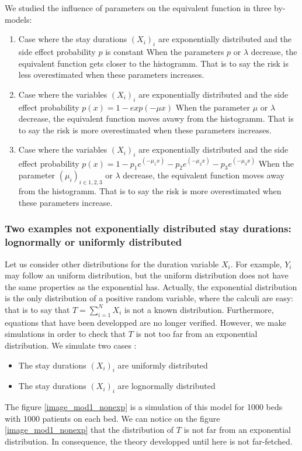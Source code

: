 \documentclass[12pt,twoside]{article}
\begin{document}
We studied the influence of parameters on the equivalent function in three by-models:
\begin{enumerate}
\item{Case where the stay durations $(X_i)_i$ are exponentially distributed and the side effect probability $p$ is constant} 
When the parameters $p$ or $\lambda$ decrease, the equivalent function gets 
closer to the histogramm. That is to say the risk is less overestimated 
when these parameters increases.
\item{Case where the variables $(X_i)_i$ are exponentially distributed and the side effect probability $p(x)=1-exp(-\mu x)$} 
When the parameter $\mu$ or $\lambda$ decrease, the equivalent function moves 
avawy from the histogramm. That is to say the risk is more overestimated 
when these parameters increases.
\item{Case where the variables $(X_i)_i$ are exponentially distributed and the side effect probability $p(x)=1-p_1 e^(-\mu_1 x)-p_2 e^(-\mu_2 x)-p_3 e^(-\mu_3 x)$} 
When the parameter $(\mu_i)_{i\in{1,2,3}}$ or $\lambda$ decrease, the equivalent function moves 
away from the histogramm. That is to say the risk is more overestimated 
when these parameters increase.
\end{enumerate}




\subsubsection{Two examples not exponentially distributed stay durations: lognormally or uniformly distributed }
Let us consider other distributions for the duration variable $X_i$. For example, $Y_i$ may follow 
an uniform distribution, but the uniform distribution does not have the same properties as
the exponential has. Actually, the exponential distribution is the only distribution of
a positive random variable, where the calculi are easy: that is to say that $T=\sum_{i=1}^N X_i$ 
is not a known distribution. Furthermore, equations that have been developped are no longer verified.
However, we make simulations in order to check that $T$ is not too far from an exponential
distribution. We simulate two cases : 
\begin{itemize}
\item{The stay durations $(X_i)_i$ are uniformly distributed }
\item{The stay durations $(X_i)_i$ are lognormally distributed }
\end{itemize}
The figure \ref{image_mod1_nonexp} is a simulation of this model for 1000 beds with
1000 patients on each bed. We can notice on the figure \ref{image_mod1_nonexp} that the
distribution of $T$ is not far from an exponential distribution. In consequence,
the theory developped until here is not far-fetched.
\end{document}
